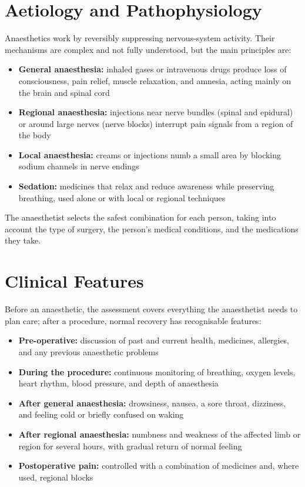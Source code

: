 \section*{Aetiology and Pathophysiology}
Anaesthetics work by reversibly suppressing nervous-system activity. Their mechanisms are complex and not fully understood, but the main principles are:
\begin{itemize}
    \item \textbf{General anaesthesia:} inhaled gases or intravenous drugs produce loss of consciousness, pain relief, muscle relaxation, and amnesia, acting mainly on the brain and spinal cord
    \item \textbf{Regional anaesthesia:} injections near nerve bundles (spinal and epidural) or around large nerves (nerve blocks) interrupt pain signals from a region of the body
    \item \textbf{Local anaesthesia:} creams or injections numb a small area by blocking sodium channels in nerve endings
    \item \textbf{Sedation:} medicines that relax and reduce awareness while preserving breathing, used alone or with local or regional techniques
\end{itemize}
The anaesthetist selects the safest combination for each person, taking into account the type of surgery, the person's medical conditions, and the medications they take.

\section*{Clinical Features}
Before an anaesthetic, the assessment covers everything the anaesthetist needs to plan care; after a procedure, normal recovery has recognisable features:
\begin{itemize}
    \item \textbf{Pre-operative:} discussion of past and current health, medicines, allergies, and any previous anaesthetic problems
    \item \textbf{During the procedure:} continuous monitoring of breathing, oxygen levels, heart rhythm, blood pressure, and depth of anaesthesia
    \item \textbf{After general anaesthesia:} drowsiness, nausea, a sore throat, dizziness, and feeling cold or briefly confused on waking
    \item \textbf{After regional anaesthesia:} numbness and weakness of the affected limb or region for several hours, with gradual return of normal feeling
    \item \textbf{Postoperative pain:} controlled with a combination of medicines and, where used, regional blocks
\end{itemize}

